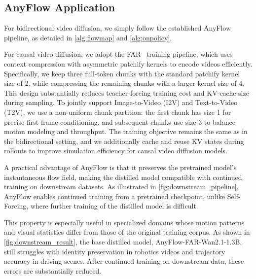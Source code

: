 \subsection{AnyFlow Application}
For bidirectional video diffusion, we simply follow the established AnyFlow pipeline, as detailed in \cref{alg:flowmap} and \cref{alg:onpolicy}.


For causal video diffusion, we adopt the FAR~\cite{gu2025long} training pipeline, which uses context compression with asymmetric patchify kernels to encode videos efficiently. Specifically, we keep three full-token chunks with the standard patchify kernel size of 2, while compressing the remaining chunks with a larger kernel size of 4. This design substantially reduces teacher-forcing training cost and KV-cache size during sampling.
%
To jointly support Image-to-Video (I2V) and Text-to-Video (T2V), we use a non-uniform chunk partition: the first chunk has size 1 for precise first-frame conditioning, and subsequent chunks use size 3 to balance motion modeling and throughput.
%
The training objective remains the same as in the bidirectional setting, and we additionally cache and reuse KV states during rollouts to improve simulation efficiency for causal video diffusion models.

A practical advantage of AnyFlow is that it preserves the pretrained model's instantaneous flow field, making the distilled model compatible with continued training on downstream datasets. As illustrated in \cref{fig:downstream_pipeline}, AnyFlow enables continued training from a pretrained checkpoint, unlike Self-Forcing, where further training of the distilled model is difficult.

This property is especially useful in specialized domains whose motion patterns and visual statistics differ from those of the original training corpus. As shown in \cref{fig:downstream_result}, the base distilled model, AnyFlow-FAR-Wan2.1-1.3B, still struggles with identity preservation in robotics videos and trajectory accuracy in driving scenes. After continued training on downstream data, these errors are substantially reduced.






